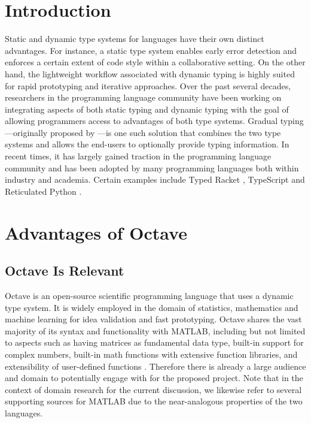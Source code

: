 \newcommand{\fig}[2]{\texttt{[image: \#2]}}
\newcommand{\centerfig}[2]{\begin{center}
\color{black} \texttt{[image: \#2]}\end{center}}
\newcommand \bnfdef  {\mathrel{::=}}
\newcommand \bnfalt  {\mathrel{|}}
\newcommand \tc[3]{{#1} \vdash {#2} : {#3}}

\section{Introduction}
Static and dynamic type systems for languages have their own distinct advantages. For instance, a static type system enables early error detection and enforces a certain extent of code style within a collaborative setting. On the other hand, the lightweight workflow associated with dynamic typing is highly suited for rapid prototyping and iterative approaches. Over the past several decades, researchers in the programming language community have been working on integrating aspects of both static typing and dynamic typing with the goal of allowing programmers access to advantages of both type systems. Gradual typing---originally proposed by \citet{siek2006gradual}---is one such solution that combines the two type systems and allows the end-users to optionally provide typing information. In recent times, it has largely gained traction in the programming language community and has been adopted by many programming languages both within industry and academia. Certain examples include Typed Racket \cite{tobin2006interlanguage}, TypeScript \cite{bierman2014understanding} and Reticulated Python \cite{vitousek2014design}.

\section{Advantages of Octave}
\subsection{Octave Is Relevant}
Octave is an open-source scientific programming language that uses a dynamic type system. It is widely employed in the domain of statistics, mathematics and machine learning for idea validation and fast prototyping. Octave shares the vast majority of its syntax and functionality with MATLAB, including but not limited to aspects such as having matrices as fundamental data type, built-in support for complex numbers, built-in math functions with extensive function libraries, and extensibility of user-defined functions \cite{wikibooks}. Therefore there is already a large audience and domain to potentially engage with for the proposed project. Note that in the context of domain research for the current discussion, we likewise refer to several supporting sources for MATLAB due to the near-analogous properties of the two languages.

